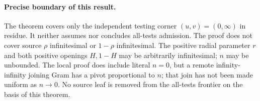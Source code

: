 \paragraph{Precise boundary of this result.}
The theorem covers only the independent testing corner $(u,v)=(0,\infty)$
in residue. It neither assumes nor concludes all-tests admission.
The proof does not cover source $\rho$ infinitesimal or
$1-\rho$ infinitesimal. The positive radial parameter $r$ and both
positive openings $H,1-H$ may be arbitrarily infinitesimal; $n$ may
be unbounded.
The local proof does include literal $n=0$, but a remote
infinity-infinity joining Gram has a pivot proportional to $n$;
that join has not been made uniform as $n\to0$. No source leaf is
removed from the all-tests frontier on the basis of this theorem.
